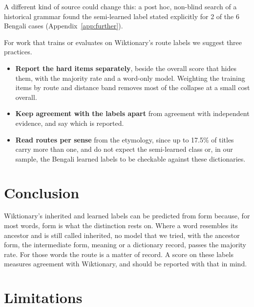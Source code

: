 \documentclass[11pt]{article}
\begin{document}
A different kind of source could change this: a post hoc, non-blind search of a historical grammar found the semi-learned label stated explicitly for 2 of the 6 Bengali cases (Appendix~\ref{app:further}).

For work that trains or evaluates on Wiktionary's route labels we suggest three practices.
\begin{itemize}
\item \textbf{Report the hard items separately}, beside the overall score that hides them, with the majority rate and a word-only model. Weighting the training items by route and distance band removes most of the collapse at a small cost overall.
\item \textbf{Keep agreement with the labels apart} from agreement with independent evidence, and say which is reported.
\item \textbf{Read routes per sense} from the etymology, since up to 17.5\% of titles carry more than one, and do not expect the semi-learned class or, in our sample, the Bengali learned labels to be checkable against these dictionaries.
\end{itemize}

\section{Conclusion}

Wiktionary's inherited and learned labels can be predicted from form because, for most words, form is what the distinction rests on. Where a word resembles its ancestor and is still called inherited, no model that we tried, with the ancestor form, the intermediate form, meaning or a dictionary record, passes the majority rate. For those words the route is a matter of record. A score on these labels measures agreement with Wiktionary, and should be reported with that in mind.

\section*{Limitations}
\end{document}
